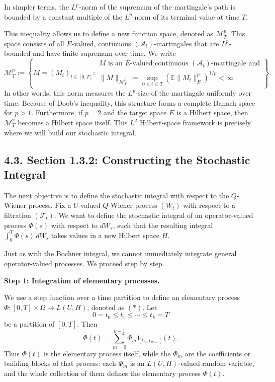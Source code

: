 \documentclass[11pt]{article}
\theoremstyle{definition}
\theoremstyle{remark}
\begin{document}
In simpler terms, the \(L^p\)-norm of the supremum of the martingale's path is bounded by a constant multiple of the \(L^p\)-norm of its terminal value at time \(T\).

This inequality allows us to define a new function space, denoted as \(\mathcal M_T^p\). This space consists of all \(E\)-valued, continuous \((\mathcal A_t)\)-martingales that are \(L^p\)-bounded and have finite supremum over time. We write
\[
\mathcal M_T^p
:=
\left\{
M=(M_t)_{t\in[0,T]} :
\begin{array}{l}
\text{\(M\) is an \(E\)-valued continuous \((\mathcal A_t)\)-martingale and} \\
\|M\|_{\mathcal M_T^p}:=\sup_{0\le t\le T}\left(\mathbb E\|M_t\|_E^p\right)^{1/p}<\infty
\end{array}
\right\}.
\]
In other words, this norm measures the \(L^p\)-size of the martingale uniformly over time.
Because of Doob's inequality, this structure forms a complete Banach space for \(p>1\). Furthermore, if \(p=2\) and the target space \(E\) is a Hilbert space, then \(\mathcal M_T^2\) becomes a Hilbert space itself. This \(L^2\) Hilbert-space framework is precisely where we will build our stochastic integral.

\subsection*{4.3. Section 1.3.2: Constructing the Stochastic Integral}
The next objective is to define the stochastic integral with respect to the \(Q\)-Wiener process. Fix a \(U\)-valued \(Q\)-Wiener process \((W_t)\) with respect to a filtration \((\mathcal F_t)\). We want to define the stochastic integral of an operator-valued process \(\Phi(s)\) with respect to \(dW_s\), such that the resulting integral \(\int_0^T \Phi(s)\,dW_s\) takes values in a new Hilbert space \(H\).

Just as with the Bochner integral, we cannot immediately integrate general operator-valued processes. We proceed step by step.

\textbf{Step 1: Integration of elementary processes.}

We use a step function over a time partition to define an elementary process \(\Phi:[0,T]\times\Omega\to L(U,H)\), denoted as \((*)\). Let
\[
0=t_0\le t_1\le \cdots \le t_k=T
\]
be a partition of \([0,T]\). Then
\[
\Phi(t)=\sum_{m=0}^{k-1}\Phi_m 1_{]t_m,t_{m+1}]}(t). \tag{*}
\]
Thus \(\Phi(t)\) is the elementary process itself, while the \(\Phi_m\) are the coefficients or building blocks of that process: each \(\Phi_m\) is an \(L(U,H)\)-valued random variable, and the whole collection of them defines the elementary process \(\Phi(t)\).
\end{document}
